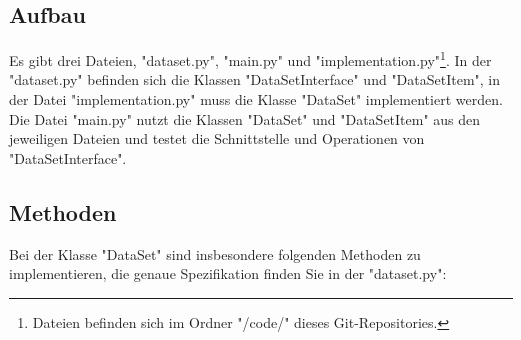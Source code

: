 \documentclass{article}
\begin{document}
		\subsection{Aufbau}
			Es gibt drei Dateien, "dataset.py", "main.py" und "implementation.py"\footnote{Dateien befinden sich im Ordner "/code/" dieses Git-Repositories.}.
			In der "dataset.py" befinden sich die Klassen "DataSetInterface" und "DataSetItem",
			in der Datei "implementation.py" muss die Klasse "DataSet" implementiert werden.
			Die Datei "main.py" nutzt die Klassen "DataSet" und "DataSetItem" aus den jeweiligen Dateien und testet die Schnittstelle und Operationen von "DataSetInterface".\\
	
		\subsection{Methoden}
			Bei der Klasse "DataSet" sind insbesondere folgenden Methoden zu implementieren, die genaue Spezifikation finden Sie in der "dataset.py":\\
\end{document}
